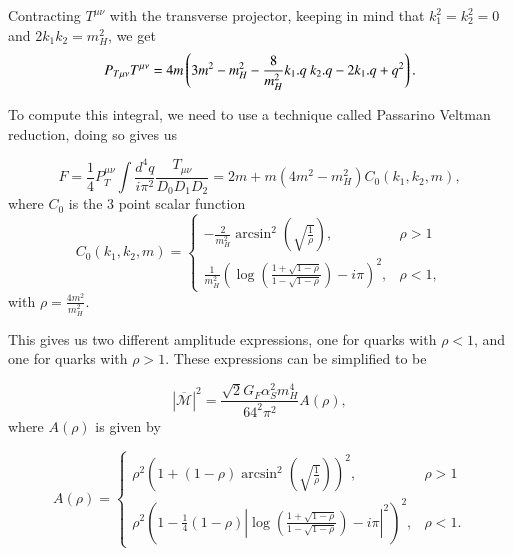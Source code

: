 \documentclass[EPJ,twocolumn]{webofc}
\begin{document}
Contracting $T^{\mu\nu}$ with the transverse projector, keeping in mind that $k_1^2=k_2^2=0$ and $2k_1k_2 = m_H^2$, we get
\begin{equation}
    P_{T\mu\nu}T^{\mu\nu} = 4m\left(3m^2-m_H^2-\frac{8}{m_H^2}k_1.q\\\ k_2.q-2k_1.q+q^2\right).
\end{equation}

To compute this integral, we need to use a technique called Passarino Veltman reduction, doing so gives us

\begin{equation}
    F  = \frac{1}{4}P_T^{\mu\nu}\int \frac{d^4q}{i\pi^2}\frac{T_{\mu\nu}}{D_0D_1D_2} = 2m+m(4m^2-m_H^2)C_0(k_1,k_2,m),
\end{equation}
where $C_0$ is the 3 point scalar function
\begin{equation}
    C_0(k_1,k_2,m) = \begin{cases}
            -\frac{2}{m_H^2}\arcsin^2{\left(\sqrt{\frac{1}{\rho}} \right)}  ,& \rho > 1  \\
             \frac{1}{m_H^2}\left(\log\left( \frac{1+\sqrt{1-\rho}}{1-\sqrt{1-\rho}}\right)-i\pi \right)^2,& \rho < 1,
            \end{cases}
\end{equation}
with $\rho = \frac{4m^2}{m_H^2}$. 

This gives us two different amplitude expressions, one for quarks with $\rho<1$, and one for quarks with $\rho>1$. These expressions can be simplified to be



\begin{equation}
    |\overline{\mathcal{M}}|^2 = \frac{\sqrt{2}G_F\alpha_S^2m_H^4}{64^2\pi^2}A\left(\rho\right),
    \label{FullAmpSquare}
\end{equation}
where $A\left(\rho\right)$ is given by

\begin{equation}
    A\left(\rho\right) = \begin{cases}
    
            \rho^2\left( 1+(1-\rho)\arcsin^2{\left(\sqrt{\frac{1}{\rho}} \right)}\right)^2  ,& \rho > 1  \\
            
            \rho^2\left( 1-\frac{1}{4}(1-\rho)\left| \log\left( \frac{1+\sqrt{1-\rho}}{1-\sqrt{1-\rho}}\right)-i\pi \right|^2\right)^2,& \rho  < 1 .
            \end{cases}
\end{equation}
\end{document}
